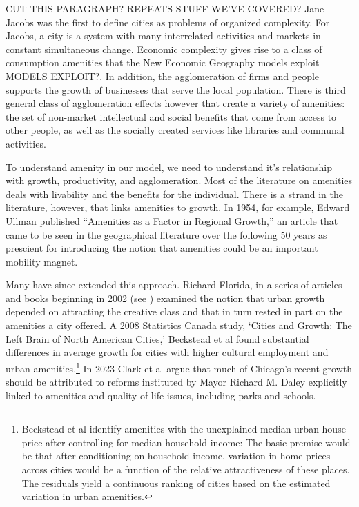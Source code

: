 CUT THIS PARAGRAPH? REPEATS STUFF WE'VE COVERED? Jane Jacobs was the first to define cities as problems of organized complexity. For Jacobs, a city is a system with many interrelated activities and markets in constant simultaneous change. Economic complexity gives rise to a class of consumption amenities that the New Economic Geography models exploit MODELS EXPLOIT?. In addition, the agglomeration of firms and people supports the growth of businesses that serve the local population. There is third general class of agglomeration effects however that  create a variety of amenities: the set of non-market intellectual and social benefits that come from access to other people, as well as the socially created services like libraries and communal activities.  

To understand amenity in our model, we need to understand it's relationship with growth, productivity, and agglomeration. Most of the literature on amenities deals with livability and the benefits for the individual. There is a strand in the literature, however, that links amenities to  growth. In 1954, for example, Edward Ullman \cite{ullmanAmenitiesFactorRegional1954} published  ``Amenities as a Factor in Regional Growth,'' an article that came to be seen in the geographical literature over the following 50 years as prescient \cite{walcottCommentsEdwardUllman2010} for introducing  the notion that amenities could be an important mobility magnet. 

Many have since extended this approach. Richard Florida, in a series of articles and books beginning in 2002 (see \cite{floridaCreativeClassEconomic2014}) examined the notion that urban growth depended on attracting  the creative class and that in turn rested in part on the amenities a city offered. A 2008  Statistics Canada study, `Cities and Growth: The Left Brain of North American Cities,' Beckstead et al  \cite{becksteadCitiesGrowthLeft2008} found substantial differences in average growth for cities with higher cultural employment and urban amenities.\footnote{Beckstead et al identify amenities with the unexplained median urban house price after controlling for median household income:  The basic premise would be that after conditioning on household income, variation in home prices across cities would be a function of the relative attractiveness of these places. The residuals  yield a continuous ranking of cities based on the estimated variation in urban amenities.} 
In 2023 Clark et al \cite{clarkAmenitiesDriveUrban2002} argue that much of Chicago's recent growth  should be attributed to reforms instituted by Mayor Richard M.  Daley  explicitly linked to amenities and quality of life issues, including parks and schools.

